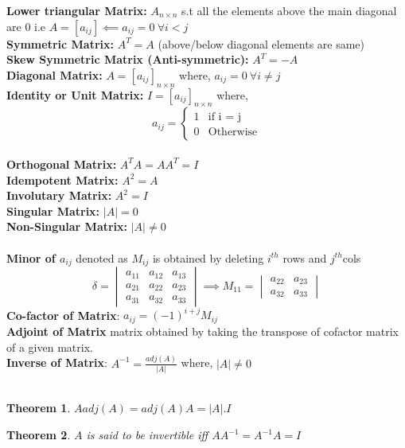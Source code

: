 \documentclass[12pt]{article}
\newtheorem{thm}{Theorem}
\begin{document}
\textbf{Lower triangular Matrix: } $A_{n \times n}$ s.t all the elements above the main diagonal are $0$ i.e $A = [a_{ij}] \impliedby a_{ij}=0\: \forall i<j$\\
\textbf{Symmetric Matrix: } $A^T = A$ (above/below diagonal elements are same)\\
\textbf{Skew Symmetric Matrix (Anti-symmetric): } $A^T=-A$\\
\textbf{Diagonal Matrix: } $A = [a_{ij}]_{n \times n}$ where, $a_{ij}=0\: \forall i\not = j$\\
\textbf{Identity or Unit Matrix: } $I = [a_{ij}]_{n \times n}$ where, 
\[ 
a_{ij}= \begin{cases}
	1 & \text{if i = j}\\
	0 & \text{Otherwise}
\end{cases}
\]\\
\textbf{Orthogonal Matrix: } $A^TA = AA^T=I$\\
\textbf{Idempotent Matrix: } $A^2 = A$\\
\textbf{Involutary Matrix: } $A^2 = I$\\
\textbf{Singular Matrix: } $|A| = 0$\\
\textbf{Non-Singular Matrix: } $|A| \not= 0$\\
\\
\textbf{Minor of $a_{ij}$} denoted as $M_{ij}$ is obtained by deleting $i^{th}$ rows and $j^{th}$cols\\
\[
	\delta = \begin{vmatrix}
	a_{11} & a_{12} & a_{13} \\
	a_{21} & a_{22} & a_{23} \\
	a_{31} & a_{32} & a_{33} 
	\end{vmatrix}
	\implies
	M_{11} = \begin{vmatrix}
	 a_{22} & a_{23} \\
	 a_{32} & a_{33}
	\end{vmatrix}
\]
\textbf{Co-factor of Matrix}: $a_{ij} = (-1)^{i+j} M_{ij}$\\
\textbf{Adjoint of Matrix } matrix obtained by taking the transpose of cofactor matrix of a given matrix.\\
\textbf{Inverse of Matrix}: $ A^{-1} = \frac{adj(A)}{|A|}$ where, $|A| \not=0$
\\
\\
\begin{thm}\normalfont
	$Aadj(A) = adj(A)A = |A|.I$
\end{thm}
\begin{thm}\normalfont
	$A$ is said to be invertible iff $AA^{-1} = A^{-1}A = I$
\end{thm}
\end{document}
